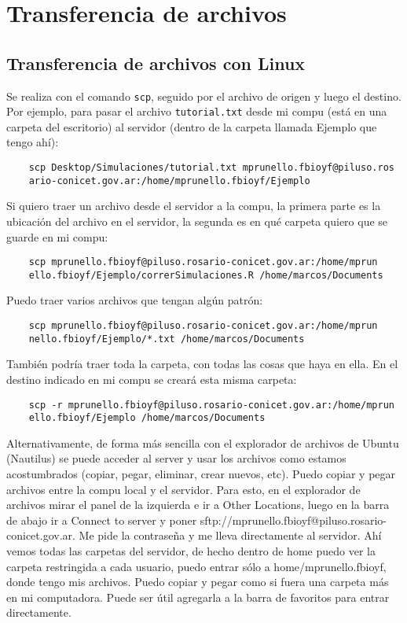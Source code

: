 \documentclass[paper=a4, fontsize=11pt]{article} %
\numberwithin{equation}{section} %
\numberwithin{figure}{section} %
\numberwithin{table}{section} %
\begin{document}
\section{Transferencia de archivos}

\subsection{Transferencia de archivos con Linux}

Se realiza con el comando \texttt{scp}, seguido por el archivo de origen y luego el destino. Por ejemplo, para pasar el archivo \texttt{tutorial.txt} desde mi compu (está en una carpeta del escritorio) al servidor (dentro de la carpeta llamada Ejemplo que tengo ahí):

\begin{verbatim}
	scp Desktop/Simulaciones/tutorial.txt mprunello.fbioyf@piluso.ros
	ario-conicet.gov.ar:/home/mprunello.fbioyf/Ejemplo
\end{verbatim}

Si quiero traer un archivo desde el servidor a la compu, la primera parte es la ubicación del archivo en el servidor, la segunda es en qué carpeta quiero que se guarde en mi compu:

\begin{verbatim}
	scp mprunello.fbioyf@piluso.rosario-conicet.gov.ar:/home/mprun
	ello.fbioyf/Ejemplo/correrSimulaciones.R /home/marcos/Documents
\end{verbatim}

Puedo traer varios archivos que tengan algún patrón:

\begin{verbatim}
	scp mprunello.fbioyf@piluso.rosario-conicet.gov.ar:/home/mprun
	nello.fbioyf/Ejemplo/*.txt /home/marcos/Documents
\end{verbatim}

También podría traer toda la carpeta, con todas las cosas que haya en ella. En el destino indicado en mi compu se creará esta misma carpeta:

\begin{verbatim}
	scp -r mprunello.fbioyf@piluso.rosario-conicet.gov.ar:/home/mprun
	ello.fbioyf/Ejemplo /home/marcos/Documents
\end{verbatim}

Alternativamente, de forma más sencilla con el explorador de archivos de Ubuntu (Nautilus) se puede acceder al server y usar los archivos como estamos acostumbrados (copiar, pegar, eliminar, crear nuevos, etc). Puedo copiar y pegar archivos entre la compu local y el servidor. Para esto, en el explorador de archivos mirar el panel de la izquierda e ir a Other Locations, luego en la barra de abajo ir a  Connect to server y poner sftp://mprunello.fbioyf@piluso.rosario-conicet.gov.ar. Me pide la contraseña y me lleva directamente al servidor. Ahí vemos todas las carpetas del servidor, de hecho dentro de home puedo ver la carpeta restringida a cada usuario, puedo entrar sólo a  home/mprunello.fbioyf, donde tengo mis archivos. Puedo copiar y pegar como si fuera una carpeta más en mi computadora. Puede ser útil agregarla a la barra de favoritos para entrar directamente.
\end{document}
